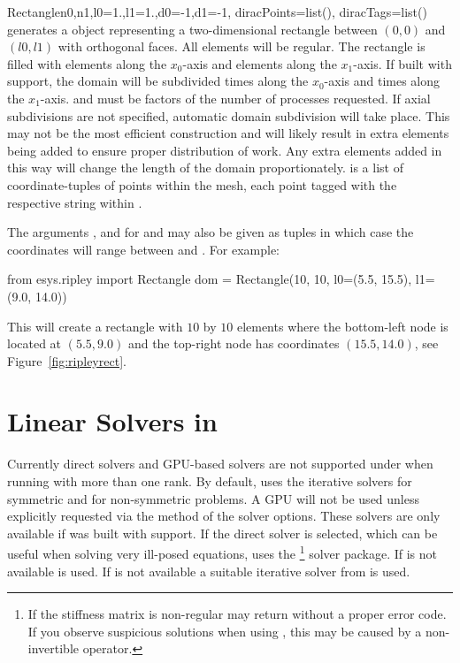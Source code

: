 \begin{funcdesc}{Rectangle}{n0,n1,l0=1.,l1=1.,d0=-1,d1=-1,
diracPoints=list(), diracTags=list()}
generates a \Domain object representing a two-dimensional rectangle between
$(0,0)$ and $(l0,l1)$ with orthogonal faces. All elements will be regular.
The rectangle is filled with
 elements along the $x_0$-axis and
 elements along the $x_1$-axis.
If built with \MPI support, the domain will be subdivided 
 times along the $x_0$-axis and
 times along the $x_1$-axis.
 and  must be factors of the number of \MPI processes requested.
If axial subdivisions are not specified, automatic domain subdivision will take
place. This may not be the most efficient construction and will likely result in
extra elements being added to ensure proper distribution of work. Any extra
elements added in this way will change the length of the domain proportionately.
 is a list of coordinate-tuples of points within the mesh,
each point tagged with the respective string within .
\end{funcdesc}

\noindent The arguments ,  and  for 
and  may also be given as tuples  in which
case the coordinates will range between  and . For example:
\begin{python}
   from esys.ripley import Rectangle
   dom = Rectangle(10, 10, l0=(5.5, 15.5), l1=(9.0, 14.0))
\end{python}

\noindent This will create a rectangle with $10$ by $10$ elements where the
bottom-left node is located at $(5.5, 9.0)$ and the top-right node has
coordinates $(15.5, 14.0)$, see Figure~\ref{fig:ripleyrect}.

\section{Linear Solvers in \SolverOptions}
Currently direct solvers and GPU-based solvers are not supported under \MPI
when running with more than one rank.
By default, \ripley uses the iterative solvers \PCG for symmetric and \BiCGStab
for non-symmetric problems.
A GPU will not be used unless explicitly requested via the
 method of the solver options.
These solvers are only available if \ripley was built with \CUDA support.
If the direct solver is selected, which can be useful when solving very
ill-posed equations, \ripley uses the \MKL\footnote{If the stiffness matrix is
non-regular \MKL may return without a proper error code. If you observe
suspicious solutions when using \MKL, this may be caused by a non-invertible
operator.} solver package. If \MKL is not available \UMFPACK is used.
If \UMFPACK is not available a suitable iterative solver from \PASO is used.



